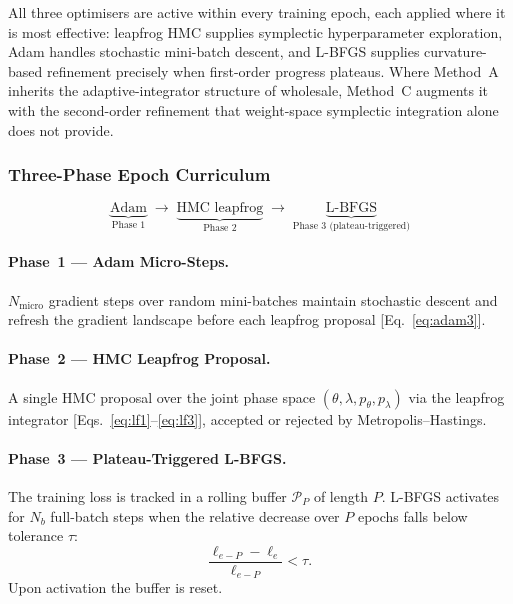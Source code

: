 \documentclass[11pt]{article}
\theoremstyle{definition}
\newcommand{\calP}{\mathcal{P}}
\begin{document}
All three optimisers are active within every training epoch, each
applied where it is most effective: leapfrog HMC supplies symplectic
hyperparameter exploration, Adam handles stochastic mini-batch
descent, and L-BFGS supplies curvature-based refinement precisely
when first-order progress plateaus. Where Method~A inherits the
adaptive-integrator structure of \cite{duruisseaux2021adaptive}
wholesale, Method~C augments it with the second-order refinement that
weight-space symplectic integration alone does not provide.

\subsubsection{Three-Phase Epoch Curriculum}

\begin{equation}
\underbrace{\text{Adam}}_{\text{Phase 1}}
\;\longrightarrow\;
\underbrace{\text{HMC leapfrog}}_{\text{Phase 2}}
\;\longrightarrow\;
\underbrace{\text{L-BFGS}}_{\text{Phase 3 (plateau-triggered)}}
\label{eq:curriculum}
\end{equation}

\paragraph{Phase~1 --- Adam Micro-Steps.}
$N_{\mathrm{micro}}$ gradient steps over random mini-batches maintain
stochastic descent and refresh the gradient landscape before each
leapfrog proposal [Eq.~\eqref{eq:adam3}].

\paragraph{Phase~2 --- HMC Leapfrog Proposal.}
A single HMC proposal over the joint phase space
$(\theta,\lambda,p_\theta,p_\lambda)$ via the leapfrog integrator
[Eqs.~\eqref{eq:lf1}--\eqref{eq:lf3}], accepted or rejected by
Metropolis--Hastings.

\paragraph{Phase~3 --- Plateau-Triggered L-BFGS.}
The training loss is tracked in a rolling buffer $\calP_P$ of length
$P$. L-BFGS activates for $N_b$ full-batch steps when the relative
decrease over $P$ epochs falls below tolerance $\tau$:
\begin{equation}
\frac{\ell_{e-P} - \ell_e}{\ell_{e-P}} < \tau.
\label{eq:plateau}
\end{equation}
Upon activation the buffer is reset.
\end{document}
